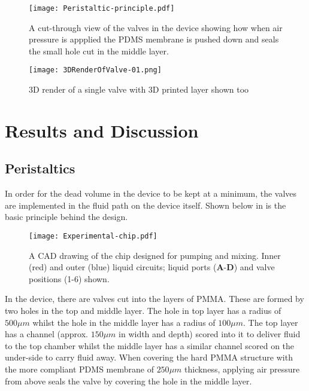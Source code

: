 \begin{figure}[h]
  \begin{center}
  \texttt{[image: Peristaltic-principle.pdf]}
  \caption{A cut-through view of the valves in the device showing how when air pressure is
  appplied the PDMS membrane is pushed down and seals the small hole cut in the middle layer.}
  \label{fig:PP-device}
  \end{center}
\end{figure}

\begin{figure}[h]
  \begin{center}
  \texttt{[image: 3DRenderOfValve-01.png]}
  \caption{3D render of a single valve with 3D printed layer shown too}
  \label{fig:ValveRend}
  \end{center}
\end{figure}

\section{Results and Discussion}

\subsection{Peristaltics}

In order for the dead volume in the device to be kept at a minimum, the valves are implemented
in the fluid path on the device itself. Shown below in  is the
basic principle behind the design.

\begin{figure}[h]
  \begin{center}
  \texttt{[image: Experimental-chip.pdf]}
  \caption{A CAD drawing of the chip designed for pumping and mixing. Inner (red) and outer (blue) liquid circuits; liquid ports (\textbf{A}-\textbf{D}) and valve positions (1-6) shown.}
  \label{fig:Chip}
  \end{center}
\end{figure}

In the device, there are valves cut into the layers of PMMA. These are formed by two holes
in the top and middle layer. The hole in top layer has a radius of $500 \mu m$ whilst the
hole in the middle layer has a radius of $100 \mu m$. The top layer has a channel (approx.
$150\mu m$ in width and depth) scored into it to deliver fluid to the top chamber whilst
the middle layer
has a similar channel scored on the under-side to carry fluid away. When covering the hard
PMMA structure with the more compliant PDMS membrane of $250 \mu m$ thickness, applying
air pressure from above seals the valve by covering the hole in the middle layer.

